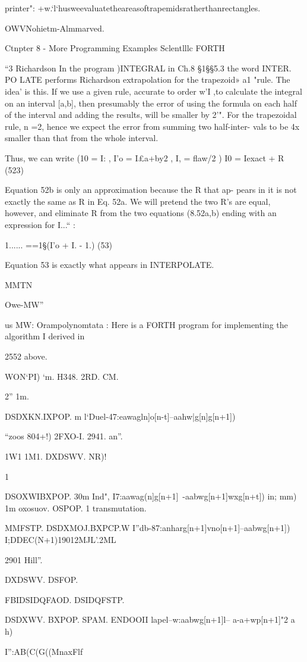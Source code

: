 {{{{{{printer": +w.‘l‘husweevaluatetheareasoftrapemidsratherthanrectangles.

OWVNohietm-Almmarved.

Ctnpter 8 - More Programming Examples Sclentlllc FORTH

“3 Richardson
In the program )INTEGRAL in Ch.8 §1§§5.3 the word INTER.
PO LATE performs Richardson extrapolation for the trapezoid»
a1 "rule. The idea' is this. If we use a given rule, accurate to order
w’I ,to calculate the integral on an interval [a,b], then presumably
the error of using the formula on each half of the interval and
adding the results, will be smaller by 2'". For the trapezoidal rule,
n =2, hence we expect the error from summing two half-inter-
vals to be 4x smaller than that from the whole interval.

Thus, we can write (10 = I: , I'o = I£a+by2 , I, = ﬂaw/2 )
I0 = Iexact + R (523)

Equation 52b is only an approximation because the R that ap-
pears in it is not exactly the same as R in Eq. 52a. We will pretend
the two R’s are equal, however, and eliminate R from the two
equations (8.52a,b) ending with an expression for I...“ :

1...... ==1§(I’o + I. - 1.) (53)

Equation 53 is exactly what appears in INTERPOLATE.

MMTN

Owe-MW”

us MW: Orampolynomtata
: Here is a FORTH program for implementing the algorithm
I derived in {2552 above.

WON‘PI) ‘m. H348. 2RD. CM.

2” 1m.

DSDXKN.IXPOP. m
l‘Duel-47:eawagln]o[n-t]--aahw|g[n]g[n+1])

“zoos 804+!) 2FXO-I. 2941. an”.

1W1 1M1. DXDSWV. NR)!

1%

DSOXWIBXPOP. 30m
Ind",
I7:aawag(n]g[n+1]~-aabwg[n+1]wxg[n+t])
in; mm) 1m oxosuov. OSPOP.
1 transmutation.
} MMFSTP. DSDXMOJ.BXPCP.W
I”db-87:anharg[n+1]vno[n+1]--aabwg[n+1])
I;DDEC(N+1)19012MJL'.2ML

2901 Hill”.

DXDSWV. DSFOP.

FBIDSIDQFAOD. DSIDQFSTP.

DSDXWV. BXPOP. SPAM. ENDOOII
lapel--w:aabwg[n+1]l-- a-a+wp[n+1]"2 a h)

I”:A{B(C(G((Mnax}Flf

}}}}}}
